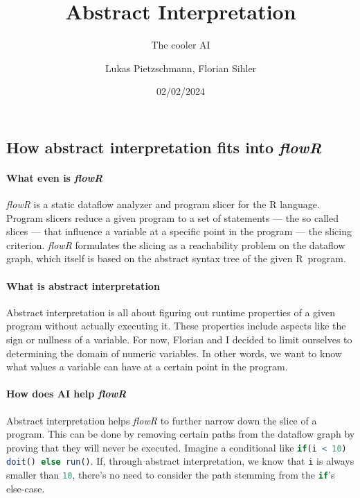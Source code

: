 \documentclass[color,coloraccent=red!60!black,listings]{poster}
\title{Abstract Interpretation}
\subtitle{The cooler AI}
\author{Lukas Pietzschmann, Florian Sihler}
\institute{Institute of Software Engineering and Programming Languages}
\date{02/02/2024}
\def\flowr{\textit{flowR}}
\def\rc#1{\lstinline[language=r]{#1}}
\begin{document}
\maketitle


\begin{multicols}{3}
	\begin{minipage}{\dimexpr2\columnwidth+\columnsep\relax}
		\section*{How abstract interpretation fits into \flowr}
		\paragraph{What even is \flowr}\flowr{} is a static dataflow analyzer and
		program slicer for the R language. Program slicers reduce a given program to a
		set of statements --- the so called slices --- that influence a variable at a
		specific point in the program --- the slicing criterion. \flowr{} formulates the
		slicing as a reachability problem on the dataflow graph, which itself is based
		on the abstract syntax tree of the given R~program.
		\paragraph{What is abstract interpretation} Abstract interpretation is all about
		figuring out runtime properties of a given program without actually executing
		it. These properties include aspects like the sign or nullness of a variable.
		For now, Florian and I decided to limit ourselves to determining the domain of
		numeric variables. In other words, we want to know what values a variable can
		have at a certain point in the program.
		\paragraph{How does AI help \flowr} Abstract interpretation helps \flowr{} to
		further narrow down the slice of a program. This can be done by removing certain
		paths from the dataflow graph by proving that they will never be executed.
		Imagine a conditional like \rc{if(i < 10) doit() else run()}.
		If, through abstract interpretation, we know that \rc{i} is always smaller than
		\rc{10}, there's no need to consider the path stemming from the \rc{if}'s
		else-case.

\end{minipage}
\end{multicols}
\end{document}
